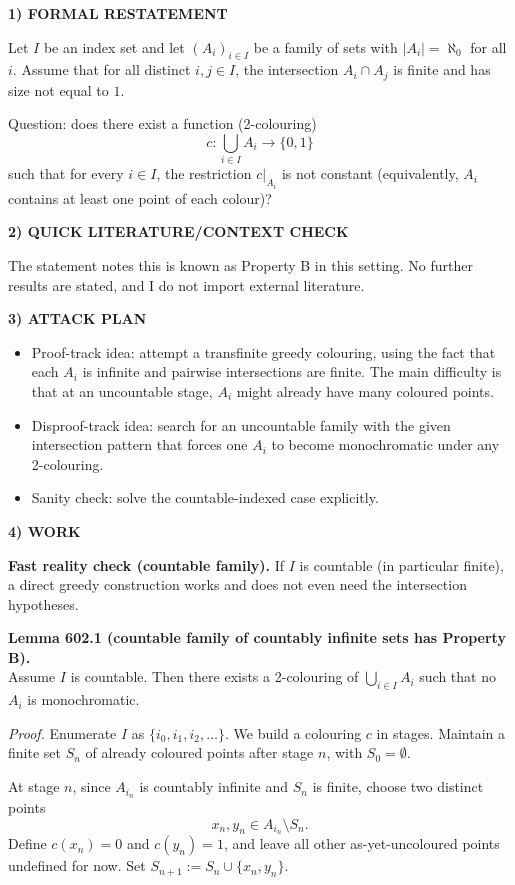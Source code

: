 \noindent\textbf{1) FORMAL RESTATEMENT}\par
Let $I$ be an index set and let $(A_i)_{i\in I}$ be a family of sets with $|A_i|=\aleph_0$ for all $i$.
Assume that for all distinct $i,j\in I$, the intersection $A_i\cap A_j$ is finite and has size not equal to $1$.

Question: does there exist a function (2-colouring)
\[
 c: \bigcup_{i\in I} A_i \to \{0,1\}
\]
such that for every $i\in I$, the restriction $c|_{A_i}$ is not constant (equivalently, $A_i$ contains at least one point of each colour)?

\noindent\textbf{2) QUICK LITERATURE/CONTEXT CHECK}\par
The statement notes this is known as Property B in this setting. No further results are stated, and I do not import external literature.

\noindent\textbf{3) ATTACK PLAN}\par
\begin{itemize}
\item Proof-track idea: attempt a transfinite greedy colouring, using the fact that each $A_i$ is infinite and pairwise intersections are finite. The main difficulty is that at an uncountable stage, $A_i$ might already have many coloured points.
\item Disproof-track idea: search for an uncountable family with the given intersection pattern that forces one $A_i$ to become monochromatic under any 2-colouring.
\item Sanity check: solve the countable-indexed case explicitly.
\end{itemize}

\noindent\textbf{4) WORK}\par
\textbf{Fast reality check (countable family).} If $I$ is countable (in particular finite), a direct greedy construction works and does not even need the intersection hypotheses.

\medskip
\noindent\textbf{Lemma 602.1 (countable family of countably infinite sets has Property B).}\\
Assume $I$ is countable. Then there exists a 2-colouring of $\bigcup_{i\in I}A_i$ such that no $A_i$ is monochromatic.

\noindent\emph{Proof.}
Enumerate $I$ as $\{i_0,i_1,i_2,\dots\}$.
We build a colouring $c$ in stages. Maintain a finite set $S_n$ of already coloured points after stage $n$, with $S_0=\emptyset$.

At stage $n$, since $A_{i_n}$ is countably infinite and $S_n$ is finite, choose two distinct points
\[
x_n, y_n \in A_{i_n}\setminus S_n.
\]
Define $c(x_n)=0$ and $c(y_n)=1$, and leave all other as-yet-uncoloured points undefined for now.
Set $S_{n+1}:=S_n\cup\{x_n,y_n\}$.

